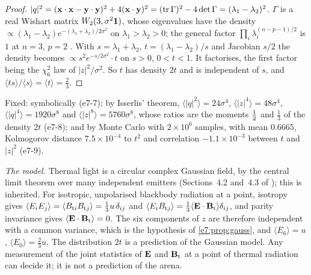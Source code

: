 \begin{proof}
$|q|^2=(\mathbf x\cdot\mathbf x-\mathbf y\cdot\mathbf y)^2+4(\mathbf x\cdot\mathbf y)^2=(\operatorname{tr}\Gamma)^2-4\det\Gamma=(\lambda_1-\lambda_2)^2$. $\Gamma$ is a real Wishart
matrix $W_2(3,\sigma^2\mathbf 1)$, whose eigenvalues have the density $\propto(\lambda_1-\lambda_2)e^{-(\lambda_1+\lambda_2)/2\sigma^2}$ on
$\lambda_1>\lambda_2>0$; the general factor $\prod_i\lambda_i^{(n-p-1)/2}$ is $1$ at $n=3$, $p=2$ \cite{Muirhead82}. With $s=\lambda_1+\lambda_2$,
$t=(\lambda_1-\lambda_2)/s$ and Jacobian $s/2$ the density becomes $\propto s^2e^{-s/2\sigma^2}\cdot t$ on $s>0$, $0<t<1$. It factorises, the first
factor being the $\chi^2_6$ law of $|z|^2/\sigma^2$. So $t$ has density $2t$ and is independent of $s$, and
$\langle ts\rangle/\langle s\rangle=\langle t\rangle=\tfrac23$.
\end{proof}

Fixed: symbolically (e7-7); by Isserlis' theorem, $\langle|q|^2\rangle=24\sigma^4$, $\langle|z|^4\rangle=48\sigma^4$,
$\langle|q|^4\rangle=1920\sigma^8$ and $\langle|z|^8\rangle=5760\sigma^8$, whose ratios are the moments $\tfrac12$ and $\tfrac13$ of the density $2t$
(e7-8); and by Monte Carlo with $2\times10^6$ samples, with mean $0.6665$, Kolmogorov distance $7.5\times10^{-4}$ to $t^2$ and correlation
$-1.1\times10^{-3}$ between $t$ and $|z|^2$ (e7-9).

\emph{The model.} Thermal light is a circular complex Gaussian field, by the central limit theorem over many independent emitters
(Sections~4.2 and~4.3 of \cite{Goodman15}); this is inherited. For isotropic, unpolarised blackbody radiation at a point, isotropy gives
$\langle E_iE_j\rangle=\langle B_{{\rm t}i}B_{{\rm t}j}\rangle=\tfrac13u\,\delta_{ij}$ and $\langle E_iB_{{\rm t}j}\rangle=\tfrac13\langle\mathbf E\cdot\mathbf B_{\rm t}\rangle\delta_{ij}$,
and parity invariance gives $\langle\mathbf E\cdot\mathbf B_{\rm t}\rangle=0$. The six components of $z$ are therefore independent with a common variance, which
is the hypothesis of \cref{e7:prop:gauss}, and $\langle E_6\rangle=u$, $\langle E_0\rangle=\tfrac23u$. The distribution $2t$ is a prediction of the
Gaussian model. Any measurement of the joint statistics of $\mathbf E$ and $\mathbf B_{\rm t}$ at a point of thermal radiation can decide it; it is not a
prediction of the arena.

